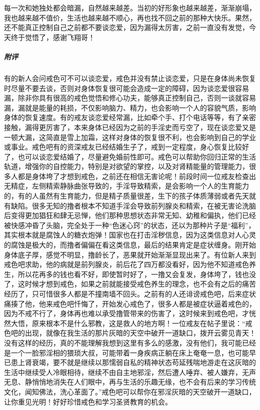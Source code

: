 \begin{case}
    每一次和她独处都会暗漏，自然越来越差。当初的好形象也越来越差，渐渐崩塌，我也越来越不值价，生活也越来越不顺心，再也找不回之前的那种大快乐。果然，还不能真正控制自己之前都不要谈恋爱，因为漏得太厉害，之前一直没有发觉，今天终于觉悟了，感谢飞翔哥！
    \subparagraph{附评} 有的新人会问戒色可不可以谈恋爱，戒色并没有禁止谈恋爱，只是在身体尚未恢复时尽量不要去谈，否则对身体恢复很可能会造成一定的障碍，因为谈恋爱很容易漏，除非你具有很高的戒色觉悟和修心功夫，能够真正控制自己，否则一谈就容易漏，漏就是能量的耗损，不仅影响脑力、精力，也会影响一个人的容貌气质，影响身体的恢复速度。有的戒友谈恋爱经常漏，比如牵个手、打个电话等等，有了亲密接触，漏得更厉害了，本来身体已经因为之前的手淫史而亏空了，现在谈恋爱又是一顿大漏，这简直是雪上加霜，这样对身体的恢复很不利，也会影响到自己的学业或事业。戒色吧有的资深戒友已经结婚生子了，戒到一定程度，身心恢复比较好了，也可以谈恋爱结婚了，尽量避免婚前性即可。戒色可以帮助你回归正常的生活轨道，增强你的自控能力，特别是对欲望的掌控，以及对肾精能量的管理能力，很多人都是身体垮了才想到戒色，之前还在相信无害论呢！前段时间一位戒友检查出无精症，左侧精索静脉曲张导致的，手淫导致精索，是会影响一个人的生育能力的，有的人虽然有生育能力，但是精子质量很差，生下的孩子体质薄弱或者先天就有缺陷。很多无知的撸者根本不知道手淫会导致前列腺炎和精索，在被无害论洗脑后变得更加猖狂和肆无忌惮，他们那种思想状态非常无知、幼稚和偏执，他们已经被快感冲昏了头脑，完全处于一种“色迷心窍”的状态，还以为那种片子是“福利”，其实根本就是腐蚀人的糖衣炮弹！国家也在打击淫秽信息，因为这类信息对人心灵的腐蚀是极大的，而撸者偏偏在看这类信息，最后的结果肯定是症状缠身。刚开始身体底子厚，感觉不明显，撸龄长了，恶果就开始渐渐显现出来了。有位新人来到戒色吧求助，他的病就是前列腺炎，前后花了四万都没看好，因为他不知道戒色养生，所以花再多的钱也看不好，即使暂时好了，一撸又会复发，身体垮了，钱也没了，这时候才想到戒色，如果之前就能接受戒色养生的理念，也不会有之后的痛苦经历了，只可惜很多人都是不撞南墙不回头。之前有的人还诽谤戒色吧，后来症状痛揍了他，他来戒色吧忏悔了，开始发心戒色了，很多人都是被症状逼着戒色的，因为不戒不行了，身体再也难以承受撸管带来的伤害了，这时候来到戒色吧，才恍然大悟，原来根本不是什么邪教，这是救人的地方啊！一位戒友在帖子里说：“戒色吧的出现，就像在我生活的那片灰暗的天空中破开一道缺口，拨开云雾见青天！没有这样的经历，真的不能理解我想到这里有多么的感激，没有他们，我可能已经是一个一脸邪淫相的猥琐大叔，可能带着一身疾病正躺在床上奄奄一息，也可能早已患上肾衰竭，要不就是继续以那懦弱自私的精神状态苟延残喘地游走在这灰暗的生活中继续受人冷眼相待，继续不由自主地邪淫，然后遭人唾弃、被人嫌弃，无声无息、静悄悄地消失在人们眼中，再与生活的乐趣无缘，也不会有后来的学习传统文化，闻知佛法，洗心革面了。”戒色吧可以帮你在邪淫灰暗的天空破开一道缺口，让你重见光明！好好珍惜戒色和学习圣贤教育的机会。
\end{case}

